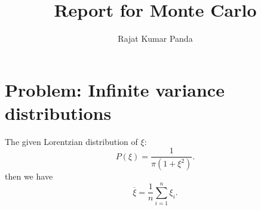 \documentclass[a4paper,10pt]{article}
\title{Report for Monte Carlo}
\author{Rajat Kumar Panda}
\begin{document}
\maketitle

\section{Problem: Infinite variance distributions}

The given Lorentzian distribution of $\xi$:
\begin{equation}
P(\xi) = \frac{1}{\pi (1+\xi^2)}.
\end{equation}
then we have 
\begin{equation}
 \overline{\xi} = \frac{1}{n}\sum_{i=1}^{n}\xi_i.
\end{equation}
\end{document}
